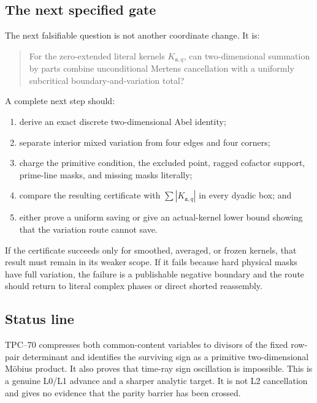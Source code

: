 \subsection{The next specified gate}

The next falsifiable question is not another coordinate change.  It is:
\begin{quote}
For the zero-extended literal kernels \(K_{\mathfrak a,q}\), can
two-dimensional summation by parts combine unconditional Mertens
cancellation with a uniformly subcritical boundary-and-variation total?
\end{quote}
A complete next step should:
\begin{enumerate}[label=\textup{(\roman*)},leftmargin=3em]
 \item derive an exact discrete two-dimensional Abel identity;
 \item separate interior mixed variation from four edges and four corners;
 \item charge the primitive condition, the excluded point, ragged cofactor
       support, prime-line masks, and missing masks literally;
 \item compare the resulting certificate with
       \(\sum|K_{\mathfrak a,q}|\) in every dyadic box; and
 \item either prove a uniform saving or give an actual-kernel lower bound
       showing that the variation route cannot save.
\end{enumerate}
If the certificate succeeds only for smoothed, averaged, or frozen
kernels, that result must remain in its weaker scope.  If it fails because
hard physical masks have full variation, the failure is a publishable
negative boundary and the route should return to literal complex phases
or direct shorted reassembly.

\subsection{Status line}

TPC--70 compresses both common-content variables to divisors of the fixed
row-pair determinant and identifies the surviving sign as a primitive
two-dimensional M\"obius product.  It also proves that time-ray sign
oscillation is impossible.  This is a genuine L0/L1 advance and a sharper
analytic target.  It is not L2 cancellation and gives no evidence that
the parity barrier has been crossed.
